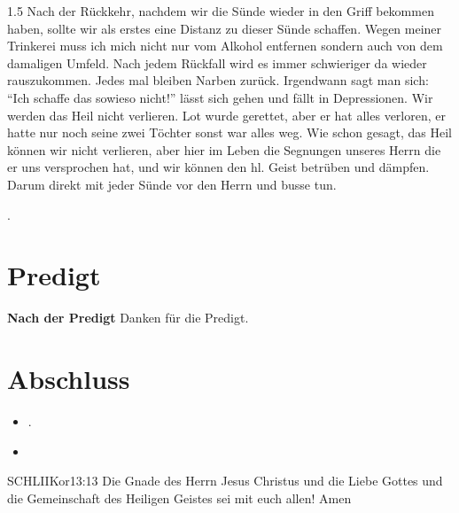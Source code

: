\documentclass[fontsize=14pt]{../../inc/mybib}
\begin{document}
\begin{spacing}{1.5}
    Nach der Rückkehr, nachdem wir die Sünde wieder in den Griff bekommen haben, sollte wir als erstes eine Distanz zu dieser Sünde schaffen. Wegen meiner Trinkerei muss ich mich nicht nur vom Alkohol entfernen sondern auch von dem damaligen Umfeld. Nach jedem Rückfall wird es immer schwieriger da wieder rauszukommen. Jedes mal bleiben Narben zurück. Irgendwann sagt man sich: \enquote{Ich schaffe das sowieso nicht!} lässt sich gehen und fällt in Depressionen.  Wir werden das Heil nicht verlieren. Lot wurde gerettet, aber er hat alles verloren, er hatte nur noch seine zwei Töchter sonst war alles weg. Wie schon gesagt, das Heil können wir nicht verlieren, aber hier im Leben die Segnungen unseres Herrn die er uns versprochen hat, und wir können den hl. Geist betrüben und dämpfen. Darum direkt mit jeder Sünde vor den Herrn und busse tun.

    \begin{block}
    \end{block}
    \begin{block}[Massada]
    \end{block}
    .
\end{spacing}
\section{Predigt}
\textbf{Nach der Predigt}\newline
Danken für die Predigt.
\section{Abschluss}
\begin{itemize}
    \item [] .
    \item [] 
\end{itemize}
\begin{bibelbox}{SCHL}{IIKor}{13:13}
    Die Gnade des Herrn Jesus Christus und die Liebe Gottes und die Gemeinschaft des Heiligen Geistes sei mit euch allen! Amen
\end{bibelbox}
\end{document}
